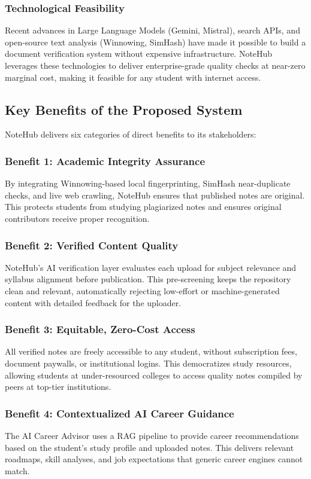 \documentclass[12,Times new Roman,a4paper]{report}
\begin{document}
\subsubsection*{Technological Feasibility}
Recent advances in Large Language Models (Gemini, Mistral), search APIs, and open-source text analysis (Winnowing, SimHash) have made it possible to build a document verification system without expensive infrastructure. NoteHub leverages these technologies to deliver enterprise-grade quality checks at near-zero marginal cost, making it feasible for any student with internet access.

\subsection{Key Benefits of the Proposed System}
NoteHub delivers six categories of direct benefits to its stakeholders:

\subsubsection*{Benefit 1: Academic Integrity Assurance}
By integrating Winnowing-based local fingerprinting, SimHash near-duplicate checks, and live web crawling, NoteHub ensures that published notes are original. This protects students from studying plagiarized notes and ensures original contributors receive proper recognition.

\subsubsection*{Benefit 2: Verified Content Quality}
NoteHub's AI verification layer evaluates each upload for subject relevance and syllabus alignment before publication. This pre-screening keeps the repository clean and relevant, automatically rejecting low-effort or machine-generated content with detailed feedback for the uploader.

\subsubsection*{Benefit 3: Equitable, Zero-Cost Access}
All verified notes are freely accessible to any student, without subscription fees, document paywalls, or institutional logins. This democratizes study resources, allowing students at under-resourced colleges to access quality notes compiled by peers at top-tier institutions.

\subsubsection*{Benefit 4: Contextualized AI Career Guidance}
The AI Career Advisor uses a RAG pipeline to provide career recommendations based on the student's study profile and uploaded notes. This delivers relevant roadmaps, skill analyses, and job expectations that generic career engines cannot match.
\end{document}
